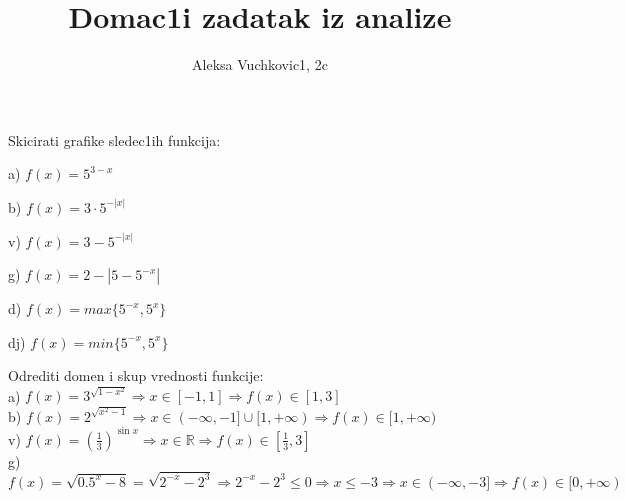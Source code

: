 \documentclass[11pt]{article}
\title{\bf{Domac1i zadatak iz analize}}
\author{\Large Aleksa Vuchkovic1, 2c}
\date{}
\begin{document}
\maketitle
\large

\begin{zad} Skicirati grafike sledec1ih funkcija:\\

\begin{multicols}{2}
a) $f(x)=5^{3-x}$
\begin{figure}[H]
    
    \label{fig:2a}
\end{figure}
\columnbreak
b) $f(x)=3\cdot 5^{-|x|}$
\begin{figure}[H]
    
    \label{fig:2b}
\end{figure}
\end{multicols}

\begin{multicols}{2}
v) $f(x)=3-5^{-|x|}$
\begin{figure}[H]
    
    \label{fig:2v}
\end{figure}
\columnbreak
g) $f(x)=2-|5-5^{-x}|$
\begin{figure}[H]
    
    \label{fig:2g}
\end{figure}
\end{multicols}

\begin{multicols}{2}
d) $f(x)=max\{5^{-x},5^x\}$
\begin{figure}[H]
    
    \label{fig:2d}
\end{figure}
\columnbreak
dj) $f(x)=min\{5^{-x},5^x\}$
\begin{figure}[H]
    
    \label{fig:2dj}
\end{figure}
\end{multicols}

\end{zad}

\begin{zad} Odrediti domen i skup vrednosti funkcije:\\[1mm]
a) $f(x)=3^{\sqrt{1-x^2}}\Rightarrow x\in [-1,1]\Rightarrow f(x)\in [1,3]$\\
b) $f(x)=2^{\sqrt{x^2-1}}\Rightarrow x\in (-\infty,-1]\cup [1,+\infty)\Rightarrow f(x)\in [1,+\infty)$\\
v) $f(x)=\left (\frac{1}{3}\right )^{\sin{x}}\Rightarrow x\in\mathbb{R}\Rightarrow f(x)\in [\frac{1}{3},3]$\\[0.5mm]
g) $f(x)=\sqrt{0.5^x-8}=\sqrt{2^{-x}-2^3}\Rightarrow 2^{-x}-2^3\leq 0 \Rightarrow x\leq -3\Rightarrow x\in(-\infty,-3]\Rightarrow f(x)\in [0,+\infty)$\\
\end{zad}
\end{document}
